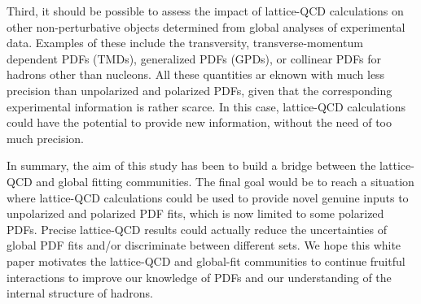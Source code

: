 Third, it should be possible to assess the impact of lattice-QCD 
calculations on other non-perturbative objects
determined from global analyses of experimental data.
%
Examples of these include the transversity, transverse-momentum dependent 
PDFs (TMDs), generalized PDFs (GPDs), or collinear PDFs for hadrons 
other than nucleons.
%
All these quantities ar eknown with much less precision than unpolarized
and polarized PDFs, given that the corresponding experimental information
is rather scarce. 
%
In this case, lattice-QCD calculations could have the potential
to provide new information, without the need of too much precision.

In summary, the aim of this study has been to build a bridge between the 
lattice-QCD and global fitting communities.
%
The final goal would be to reach a situation where lattice-QCD calculations 
could be used to provide novel genuine inputs to unpolarized and polarized 
PDF fits, which is now limited to some polarized PDFs. 
%
Precise lattice-QCD results could actually reduce the uncertainties of
global PDF fits and/or discriminate between different sets.
%
We hope this white paper motivates the lattice-QCD and global-fit
communities to continue fruitful interactions to improve our knowledge of PDFs
and our understanding of the internal structure of hadrons.
